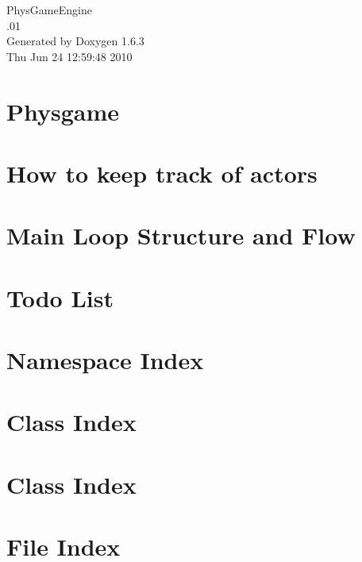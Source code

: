 \documentclass[a4paper]{book}
\begin{document}
\hypersetup{pageanchor=false}
\begin{titlepage}
\vspace*{7cm}
\begin{center}
{\Large PhysGameEngine \\[1ex]\large .01 }\\
\vspace*{1cm}
{\large Generated by Doxygen 1.6.3}\\
\vspace*{0.5cm}
{\small Thu Jun 24 12:59:48 2010}\\
\end{center}
\end{titlepage}
\clearemptydoublepage
{}
\tableofcontents
\clearemptydoublepage
{}
\hypersetup{pageanchor=true}
\chapter{Physgame}
\label{index}\hypertarget{index}{}
\chapter{How to keep track of actors}
\label{actorcontainer1}
\hypertarget{actorcontainer1}{}

\chapter{Main Loop Structure and Flow}
\label{mainloop1}
\hypertarget{mainloop1}{}

\chapter{Todo List}
\label{todo}
\hypertarget{todo}{}

\chapter{Namespace Index}

\chapter{Class Index}

\chapter{Class Index}

\chapter{File Index}

\end{document}
